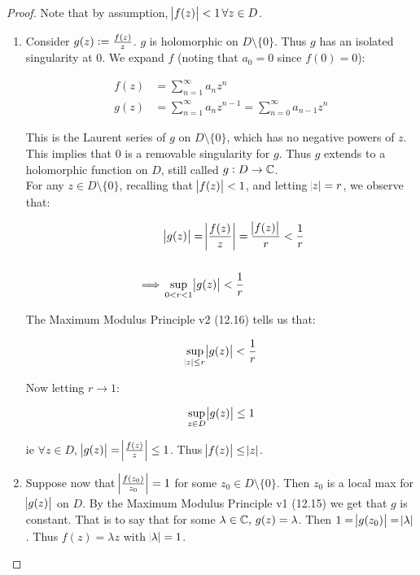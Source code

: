 \begin{proof}
Note that by assumption, $\abs{f(z)} < 1  \, \forall z \in D$.

\begin{enumerate}
    \item Consider $g(z) \vcentcolon = \frac{f(z)}{z}$. $g$ is holomorphic on $D \setminus \{ 0 \}$. Thus $g$ has an isolated singularity at $0$. We expand $f$ (noting that $a_0 = 0$ since $f(0) = 0$):

\begin{align*}
    f(z) &= \sum_{n=1}^\infty a_n z^n\\
    g(z) &= \sum_{n=1}^\infty a_n z^{n-1} = \sum_{n=0}^\infty a_{n-1} z^{n}
\end{align*}

This is the Laurent series of $g$ on $D \setminus \{ 0 \}$, which has no negative powers of $z$. This implies that $0 $ is a removable singularity for $g$. Thus $g$ extends to a holomorphic function on $D$, still called $g: D \to \mathbb{C}$.\\

For any $z \in D \setminus \{ 0 \}$, recalling that $\abs{f(z)} < 1$, and letting $\abs{z} = r$, we observe that:

\begin{align*}
    &\abs{g(z)} = \abs{\frac{f(z)}{z}} = \frac{\abs{f(z)}}{r} < \frac{1}{r}\\\\
    \implies &\sup_{0 < r < 1} \abs{g(z)} < \frac{1}{r}
\end{align*}

The Maximum Modulus Principle v2 (12.16) tells us that:

\begin{align*}
    \sup_{\abs{z} \leq r} \abs{g(z)} < \frac{1}{r}
\end{align*}


Now letting $r \to 1$:

\begin{align*}
    \sup_{z \in D} \abs{g(z)} \leq 1
\end{align*}

ie $\forall z \in D$, $\abs{g (z) } = \abs{ \frac{f(z)}{ z }} \leq 1$. Thus $\abs{f(z)} \leq \abs{z}$.


\item Suppose now that $\abs{ \frac{f(z_0)}{z_0} } = 1$ for some $z_0 \in D \setminus \{ 0 \}$. Then $z_0$ is a local max for $\abs{g(z)}$ on $D$. By the Maximum Modulus Principle v1 (12.15) we get that $g$ is constant. That is to say that for some $\lambda \in \mathbb{C}, \, g(z) = \lambda$. Then $1 = \abs{g(z_0) } = \abs{\lambda}$. Thus $f (z) = \lambda z$ with $\abs{\lambda} = 1$.


\end{enumerate}
\end{proof}
